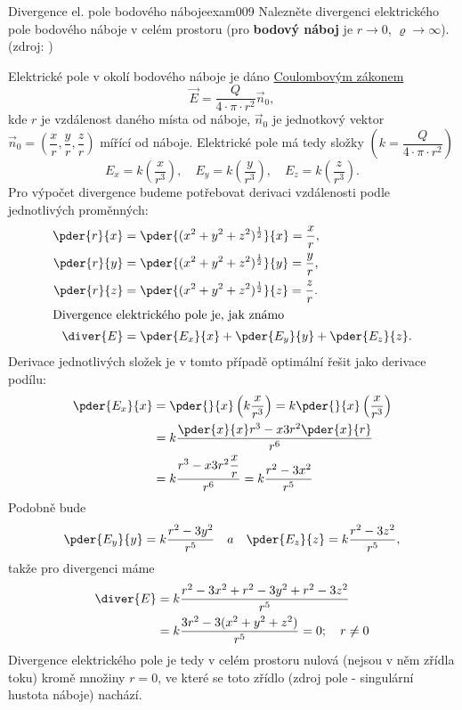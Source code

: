 \begin{fyzexam}{Divergence el. pole bodového náboje}{exam009}
  Nalezněte divergenci elektrického pole bodového náboje v celém prostoru (pro 
  \textbf{bodový náboj} je \(r\rightarrow0\), \(\varrho\rightarrow\infty\)).
  (zdroj: \librariaALDBR)

  Elektrické pole v okolí bodového náboje je dáno \hyperlink{fyz:IIchapIVsecII}{Coulombovým zákonem}
  \[\vec{E} = \frac{Q}{4\cdot\pi\cdot r^2}\vec{n}_0,\] kde \(r\) je vzdálenost daného místa od
  náboje, \(\vec{n}_0\) je jednotkový vektor \(\vec{n}_0 = \left(\dfrac{x}{r}, \dfrac{y}{r},
  \dfrac{z}{r}\right)\) mířící od náboje. Elektrické pole má tedy složky \(\left(k =
  \dfrac{Q}{4\cdot\pi\cdot r^2}\right)\)
  \begin{equation*}
    E_x = k\left(\frac{x}{r^3}\right), \quad
    E_y = k\left(\frac{y}{r^3}\right), \quad
    E_z = k\left(\frac{z}{r^3}\right).
  \end{equation*}
  Pro výpočet divergence budeme potřebovat derivaci vzdálenosti podle jednotlivých
  proměnných:
  \begin{align*}
    \pder{r}{x} &= \pder{(x^2 + y^2 + z^2)^\frac{1}{2}}{x} = \frac{x}{r},  \\
    \pder{r}{y} &= \pder{(x^2 + y^2 + z^2)^\frac{1}{2}}{y} = \frac{y}{r},  \\ 
    \pder{r}{z} &= \pder{(x^2 + y^2 + z^2)^\frac{1}{2}}{z} = \frac{z}{r}.  \\
    \shortintertext{Divergence elektrického pole je, jak známo}            
    \diver{E}   &= \pder{E_x}{x} + \pder{E_y}{y} + \pder{E_z}{z}.
  \end{align*}
  Derivace jednotlivých složek je v tomto případě optimální řešit jako derivace podílu:
  \begin{align*}
    \pder{E_x}{x}  &=  \pder{ }{x}\left(k\dfrac{x}{r^3}\right)         
                    = k\pder{ }{x}\left(\dfrac{x}{r^3}\right)                \\ 
                   &= k\dfrac{\pder{x}{x}r^3-x3r^2\pder{x}{r}}{r^6}          \\
                   &= k\dfrac{r^3-x3r^2\dfrac{x}{r}}{r^6}
                    = k\dfrac{r^2-3x^2}{r^5}
  \end{align*}
  Podobně bude
  \begin{equation*}
    \pder{E_y}{y} = k\dfrac{r^2-3y^2}{r^5} \quad a \quad
    \pder{E_z}{z} = k\dfrac{r^2-3z^2}{r^5},
  \end{equation*}
  takže pro divergenci máme
  \begin{align*}
    \diver{E} &= k\dfrac{r^2 - 3x^2 + r^2 - 3y^2 + r^2 - 3z^2}{r^5}       \\
              &= k\dfrac{3r^2-3(x^2 + y^2 + z^2)}{r^5} = 0; \quad r\neq0
  \end{align*}
  Divergence elektrického pole je tedy v celém prostoru nulová (nejsou v něm zřídla toku) kromě 
  množiny \(r = 0\), ve které se toto zřídlo (zdroj pole - singulární hustota náboje) nachází.
\end{fyzexam}